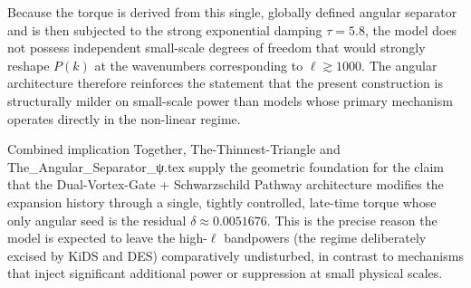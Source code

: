 Because the torque is derived from this single, globally defined angular separator and is then subjected to the strong exponential damping \(\tau=5.8\), the model does not possess independent small-scale degrees of freedom that would strongly reshape \(P(k)\) at the wavenumbers corresponding to \(\ell \gtrsim 1000\). The angular architecture therefore reinforces the statement that the present construction is structurally milder on small-scale power than models whose primary mechanism operates directly in the non-linear regime.

Combined implication  
Together, The-Thinnest-Triangle and The_Angular_Separator_ψ.tex supply the geometric foundation for the claim that the Dual-Vortex-Gate + Schwarzschild Pathway architecture modifies the expansion history through a single, tightly controlled, late-time torque whose only angular seed is the residual \(\delta \approx 0.0051676\). This is the precise reason the model is expected to leave the high-\(\ell\) bandpowers (the regime deliberately excised by KiDS and DES) comparatively undisturbed, in contrast to mechanisms that inject significant additional power or suppression at small physical scales.
